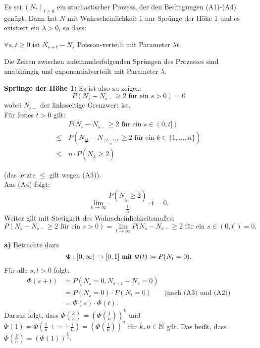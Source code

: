 \documentclass[a4paper,twoside,DIV15,BCOR12mm]{scrbook}
\begin{document}
\begin{satz}
  \label{satz:7.1}
  Es sei $(N_t)_{t\geq 0}$ ein stochastischer Prozess, der den Bedingungen (A1)-(A4) genügt.
  Dann hat $N$ mit Wahrscheinlichkeit $1$ nur Sprünge der Höhe $1$ und es existiert ein
  $\lambda>0$, so dass:
  \begin{enuma}
  \item $\forall s,t\geq 0$ ist $N_{s+t}-N_s$ Poisson-verteilt mit Parameter $\lambda t$.
  \item Die Zeiten zwischen aufeinanderfolgenden Sprüngen des Prozesses sind unabhängig und exponentialverteilt mit Parameter $\lambda$.
  \end{enuma}
\end{satz}


\begin{beweis} 
\textbf{Sprünge der Höhe 1:} Es ist also zu zeigen:
  \[
  P(N_s-N_{s-}\geq 2 \text{ für ein } s>0)=0
  \]
  wobei $N_{s-}$ der linksseitige Grenzwert ist. \\
  Für festes $t>0$ gilt:
  \begin{align*}
   & P(N_s-N_{s-}\geq 2 \text{ für ein } s\in (0,t]) \\
\leq \, & P(N_{\frac{kt}{n}}-N_{\frac{(k-1)t}{n}}\geq 2 \text{ für ein } k\in\{1,\dots,n\}) \\    
\leq \, & n\cdot P(N_{\frac{t}{n}}\geq 2)
  \end{align*}

(das letzte $\leq$ gilt wegen (A3)). \\
Aus (A4) folgt:
\[
\lim_{n\rightarrow\infty} \frac{P(N_{\frac{t}{n}}\geq 2)}{\frac{t}{n}}\cdot t=0.
\]
Weiter gilt mit Stetigkeit des Wahrscheinlichkeitsmaßes:
\[
P(N_s-N_{s-}\geq 2 \text{ für ein } s>0)=
\lim_{t\rightarrow\infty}P(N_s-N_{s-}\geq 2 \text{ für ein } s\in (0,t])=0.
\]

\textbf{a)} Betrachte dazu
\[
\Phi:[0,\infty) \to [0,1] \text{ mit }\Phi(t) \da P(N_t =0).
\]
Für alle $s,t>0$ folgt:
\begin{align*}
\Phi(s+t)
&= P(N_s = 0,N_{s+t} - N_s = 0) \\
 &= P(N_s=0) \cdot P(N_t=0) &\text{(nach (A3) und (A2))}\\
&= \Phi(s) \cdot \Phi(t).
\end{align*}
Daraus folgt, dass $\Phi(\frac kn) = (\Phi(\frac 1n))^k$ und $\Phi(1) = \Phi(\frac 1n + \cdots + \frac 1n) = (\Phi(\frac 1n))^n$ für $k,n\in \mathbb{N}$ gilt. Das heißt, dass $\Phi(\frac kn) = (\Phi(1))^{\frac kn}$.


\end{beweis}
\end{document}
